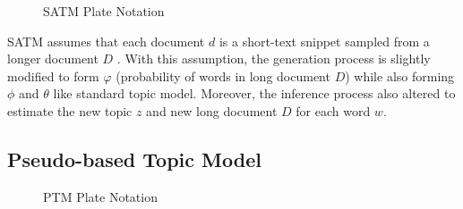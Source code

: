 \documentclass[senior]{IPSstyle}
\begin{document}
\begin{figure}[h]
	\centering
	\caption{SATM Plate Notation}
\label{fig_satm}
\end{figure}

SATM assumes that each document $d$ is a short-text snippet sampled from a longer document $D$ . With this assumption, the generation process is slightly modified to form $\varphi$ (probability of words in long document $D$) while also forming $\phi$ and $\theta$ like standard topic model. Moreover, the inference process also altered to estimate the new topic $z$ and new long document $D$ for each word $w$.

\subsection{Pseudo-based Topic Model~\cite{zuo2}}

\begin{figure}[h]
	\centering
	\caption{PTM Plate Notation}
\label{fig_ptm}
\end{figure}
\end{document}

